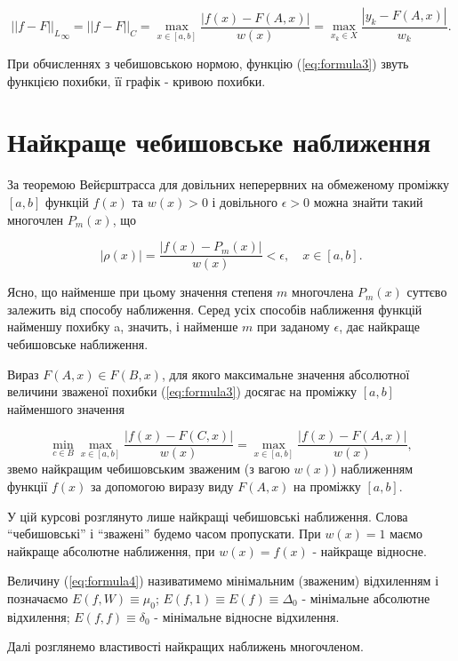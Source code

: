 \documentclass[ukrainian,14pt]{extarticle}
\begin{document}
$${||f-F||_L}_{\infty} = ||f-F||_C = \max_{x \in [a,b]} \frac{ \left| f(x) - F(A,x) \right| }{w(x)} = \max_{x_k \in X} \frac{ \left| y_k - F(A,x) \right| }{w_k}.$$

При обчисленнях з чебишовською нормою, функцію (\ref{eq:formula3}) звуть функцією похибки, її графік - кривою похибки.

\section{Найкраще чебишовське наближення}

За теоремою Вейєрштрасса для довільних неперервних на обмеженому проміжку $[a,b]$   
функцій $f(x)$ та $w(x) > 0$ і довільного $\epsilon > 0$ можна знайти такий многочлен $P_m(x)$, що

$$|\rho(x)| = \frac{|f(x) - P_m(x)|}{w(x)} < \epsilon, \quad x \in [a,b].$$

Ясно, що найменше при цьому значення степеня $m$ многочлена $P_m(x)$ суттєво залежить від способу наближення. Серед усіх способів наближення функцій найменшу похибку a, значить, і найменше $m$ при заданому $\epsilon$, дає найкраще чебишовське наближення.

Вираз $F(A,x) \in F(B,x)$, для якого максимальне значення абсолютної величини зваженої похибки (\ref{eq:formula3}) досягає на проміжку $[a,b]$ найменшого значення

\begin{equation}\label{eq:formula4}
\min_{c \in B} \max_{x \in [a,b]} \frac{|f(x) - F(C,x)|}{w(x)} = \max_{x \in [a,b]} \frac{|f(x) - F(A,x)|}{w(x)},
\end{equation}
звемо найкращим чебишовським зваженим (з вагою $w(x)$) наближенням функції $f(x)$ за допомогою виразу виду $F(A,x)$ на проміжку $[a,b]$.

У цій курсові розглянуто лише найкращі чебишовські наближення. Слова ``чебишовські'' і ``зважені'' будемо часом пропускати. При $w(x) = 1$ маємо найкраще абсолютне наближення, при $w(x) = f(x)$ - найкраще відносне.

Величину (\ref{eq:formula4}) називатимемо мінімальним (зваженим) відхиленням і позначаємо $E(f,W)\equiv\mu_0$; $E(f,1) \equiv E(f) \equiv \Delta_0$ - мінімальне абсолютне відхилення; $E(f,f) \equiv \delta_0$ - мінімальне відносне відхилення.

Далі розглянемо властивості найкращих наближень многочленом.\\
\end{document}
